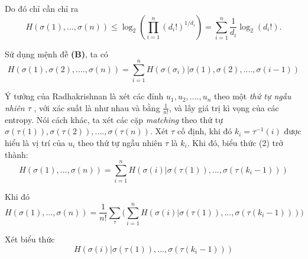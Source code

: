 \documentclass[a4paper]{report}
\begin{document}
Do đó chỉ cần chỉ ra
\begin{equation}
    H(\sigma(1),...,\sigma(n)) \leq \log_{2}(\prod_{i=1}^{n}(d_{i}!)^{1/d_{i}}) = \sum_{i=1}^{n}\frac{1}{d_{i}}\log_{2}(d_{i}!).
\end{equation}

Sử dụng mệnh đề \textbf{(B)}, ta có
\begin{equation}
H(\sigma (1), \sigma (2), ....  ,\sigma (n)) = \displaystyle \sum_{i=1}^{n}H(\sigma (\sigma_{i})| \sigma (1), \sigma (2), ....  ,\sigma (i-1))
\end{equation}

Ý tưởng của Radhakrishnan là xét các đỉnh  $u_{1}, u_{2}, ....  , u_{n}$ theo một \textit{thứ tự ngẫu nhiên $\tau$} , với xác suất là như nhau và bằng $\frac{1}{n!}$, và lấy giá trị kì vọng của các entropy. Nói cách khác, ta xét các cặp \textit{matching} theo thứ tự $\sigma (\tau (1)), \sigma (\tau (2)), .... , \sigma (\tau (n))$. Xét $\tau$ cố định, khi đó $k_{i} = \tau ^{-1}(i)$ được hiểu là vị trí của $u_{i}$ theo thứ tự ngẫu nhiên $\tau$ là $k_{i}$. Khi đó, biểu thức (2) trở thành:
\begin{equation*}
	H(\sigma(1),...,\sigma(n)) = \displaystyle \sum_{i=1}^{n}H(\sigma (i)| \sigma (\tau(1)),...,\sigma (\tau(k_{i}-1)))
\end{equation*}

Khi đó
\begin{equation*}
	H(\sigma(1),...,\sigma(n)) = \frac{1}{n!}\displaystyle \sum_{\tau}\Bigg(\displaystyle \sum_{i=1}^{n}H(\sigma (i)| \sigma (\tau(1)),...,\sigma (\tau(k_{i}-1))) \Bigg)
\end{equation*}

Xét biểu thức 
\begin{equation}
H(\sigma (i)| \sigma (\tau(1)),...,\sigma (\tau(k_{i}-1)))
\end{equation}
\\
\end{document}
